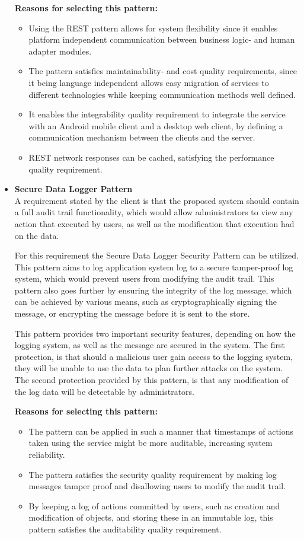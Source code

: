 \documentclass[a4paper,10pt]{article}
\begin{document}
\begin{itemize}
		\subitem \textbf{Reasons for selecting this pattern:}
		\begin{itemize}
			\item Using the REST pattern allows for system flexibility since it enables platform independent communication between business logic- and human adapter modules.
			\item The pattern satisfies maintainability- and cost quality requirements, since it being language independent allows easy migration of services to different technologies while keeping communication methods well defined.
			\item It enables the integrability quality requirement to integrate the service with an Android mobile client and a desktop web client, by defining a communication mechanism between the clients and the server.
			\item REST network responses can be cached, satisfying the performance quality requirement.
		\end{itemize}
		
		\item \textbf{Secure Data Logger Pattern} \\
		A requirement stated by the client is that the proposed system should contain a full audit trail functionality, which would allow administrators to view any action that executed by users, as well as the modification that execution had on the data.
		
		For this requirement the Secure Data Logger Security Pattern can be utilized. This pattern aims to log application system log to a secure tamper-proof log system, which would prevent users from modifying the audit trail. This pattern also goes further by ensuring the integrity of the log message, which can be achieved by various means, such as cryptographically signing the message, or encrypting the message before it is sent to the store.
		
		This pattern provides two important security features, depending on how the logging system, as well as the message are secured in the system.  The first protection, is that should a malicious user gain access to the logging system, they will be unable to use the data to plan further attacks on the system.  The second protection provided by this pattern, is that any modification of the log data will be detectable by administrators.
		
		\subitem \textbf{Reasons for selecting this pattern:}
		\begin{itemize}
			\item The pattern can be applied in such a manner that timestamps of actions taken using the service might be more auditable, increasing system reliability.
			\item The pattern satisfies the security quality requirement by making log messages tamper proof and disallowing users to modify the audit trail.
			\item By keeping a log of actions committed by users, such as creation and modification of objects, and storing these in an immutable log, this pattern satisfies the auditability quality requirement.
		\end{itemize}
		

\end{itemize}
\end{document}
